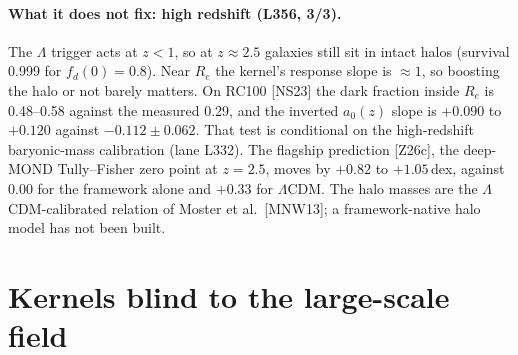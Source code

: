 \documentclass[10pt]{article}
\begin{document}
\paragraph{What it does not fix: high redshift (L356, 3/3).} The $\Lambda$ trigger acts at $z<1$, so at $z\approx2.5$ galaxies still sit in intact halos (survival 0.999 for $f_d(0)=0.8$). Near $R_e$ the kernel's response slope is $\approx1$, so boosting the halo or not barely matters. On RC100 [NS23] the dark fraction inside $R_e$ is 0.48--0.58 against the measured 0.29, and the inverted $a_0(z)$ slope is $+0.090$ to $+0.120$ against $-0.112\pm0.062$. That test is conditional on the high-redshift baryonic-mass calibration (lane L332). The flagship prediction [Z26c], the deep-MOND Tully--Fisher zero point at $z=2.5$, moves by $+0.82$ to $+1.05$\,dex, against $0.00$ for the framework alone and $+0.33$ for $\Lambda$CDM. The halo masses are the $\Lambda$CDM-calibrated relation of Moster et al.\ [MNW13]; a framework-native halo model has not been built.

\section{Kernels blind to the large-scale field}\label{sec:blind}
\end{document}
